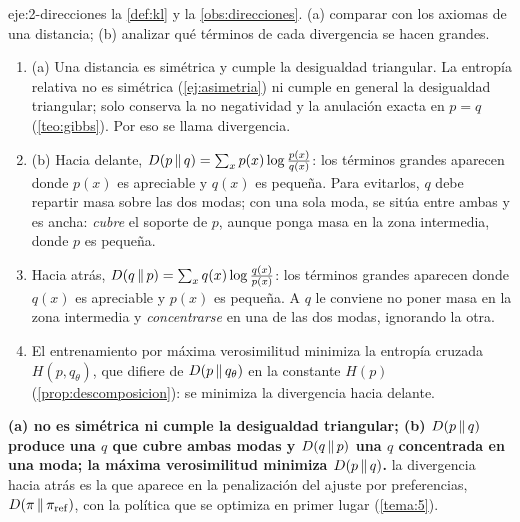 \begin{solucion}{eje:2-direcciones}
\datos la \cref{def:kl} y la \cref{obs:direcciones}.
\planteamiento (a) comparar con los axiomas de una distancia; (b) analizar qué términos de cada divergencia se hacen grandes.
\pasos
\begin{enumerate}[label=\arabic*.]
  \item (a) Una distancia es simétrica y cumple la desigualdad triangular. La entropía relativa no es simétrica (\cref{ej:asimetria}) ni cumple en general la desigualdad triangular; solo conserva la no negatividad y la anulación exacta en $p=q$ (\cref{teo:gibbs}). Por eso se llama divergencia.
  \item (b) Hacia delante, $D(p\,\|\,q)=\sum_xp(x)\log\frac{p(x)}{q(x)}$: los términos grandes aparecen donde $p(x)$ es apreciable y $q(x)$ es pequeña. Para evitarlos, $q$ debe repartir masa sobre las dos modas; con una sola moda, se sitúa entre ambas y es ancha: \emph{cubre} el soporte de $p$, aunque ponga masa en la zona intermedia, donde $p$ es pequeña.
  \item Hacia atrás, $D(q\,\|\,p)=\sum_xq(x)\log\frac{q(x)}{p(x)}$: los términos grandes aparecen donde $q(x)$ es apreciable y $p(x)$ es pequeña. A $q$ le conviene no poner masa en la zona intermedia y \emph{concentrarse} en una de las dos modas, ignorando la otra.
  \item El entrenamiento por máxima verosimilitud minimiza la entropía cruzada $H(p,q_\theta)$, que difiere de $D(p\,\|\,q_\theta)$ en la constante $H(p)$ (\cref{prop:descomposicion}): se minimiza la divergencia hacia delante.
\end{enumerate}
\resultado \textbf{(a) no es simétrica ni cumple la desigualdad triangular; (b) $D(p\,\|\,q)$ produce una $q$ que cubre ambas modas y $D(q\,\|\,p)$ una $q$ concentrada en una moda; la máxima verosimilitud minimiza $D(p\,\|\,q)$.}
\comprobacion la divergencia hacia atrás es la que aparece en la penalización del ajuste por preferencias, $D(\pi\,\|\,\pi_{\mathrm{ref}})$, con la política que se optimiza en primer lugar (\cref{tema:5}).
\end{solucion}

